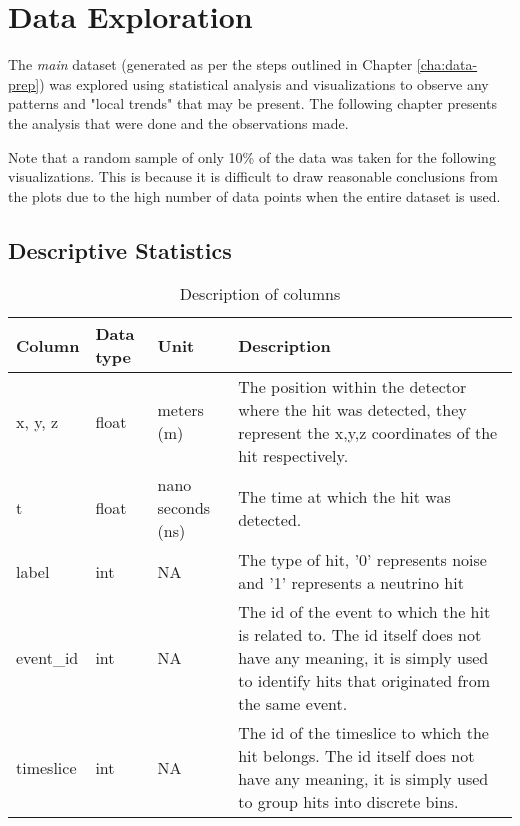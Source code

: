 
\chapter{Data Exploration} %
\label{cha:data-exp}


The \emph{main} dataset (generated as per the steps outlined in Chapter
\ref{cha:data-prep}) was explored using statistical analysis and
visualizations to observe any patterns and "local trends" that may be
present. The following chapter presents the analysis that were done and the
observations made.

Note that a random sample of only 10\% of the data was taken for the following
visualizations. This is because it is difficult to draw reasonable conclusions
from the plots due to the high number of data points when the entire dataset is
used.

\section{Descriptive Statistics}%
\label{sec:data-exp-desc-stats}

\begin{table}[h]
  \centering
  \caption{Description of columns}
  \label{tab:desc-cols}
  \begin{tabular}{p{1.5cm}p{1.5cm}p{2cm}p{8cm}}
    \hline
    Column & Data type & Unit & Description \\
    \hline
    x, y, z & float & meters (m) & The position within the detector where the hit was detected, they represent the x,y,z coordinates of the hit respectively. \\
    t & float & nano seconds (ns) & The time at which the hit was detected. \\
    label & int & NA & The type of hit, '0' represents noise and '1' represents a neutrino hit \\
    event\_id & int & NA & The id of the event to which the hit is related to. The id itself does not have any meaning, it is simply used to identify hits that originated from the same event. \\
    timeslice & int & NA & The id of the timeslice to which the hit belongs. The id itself does not have any meaning, it is simply used to group hits into discrete bins. \\
    \hline
  \end{tabular}
\end{table}

